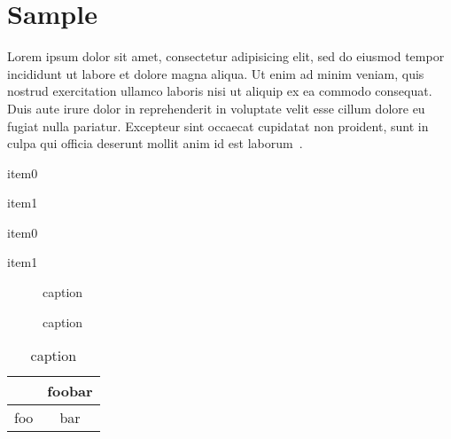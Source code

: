 \section{Sample}
\label{sec:sample}

Lorem ipsum dolor sit amet, consectetur adipisicing elit, sed do eiusmod tempor
incididunt ut labore et dolore magna aliqua. Ut enim ad minim veniam, quis
nostrud exercitation ullamco laboris nisi ut aliquip ex ea commodo consequat.
Duis aute irure dolor in reprehenderit in voluptate velit esse cillum dolore eu
fugiat nulla pariatur. Excepteur sint occaecat cupidatat non proident, sunt in
culpa qui officia deserunt mollit anim id est laborum~\cite{patt85}.

\begin{itemize*}
\item item0
\item item1
\end{itemize*}

{\setlength{\leftmargini}{0.2in}
\begin{itemize*}
\item item0
\item item1
\end{itemize*}
}

\begin{figure}[h]
\centering
\vspace{1in}
\caption{caption}
\label{fig:naive}
\end{figure}

\begin{figure}[h!]
\centering
\subfloat[subcaption0]{
\label{fig:subfig0}
\hspace{1.0in}
}
\subfloat[subcaption1]{
\label{fig:subfig1}
\hspace{1.0in}
}
\caption{caption}
\label{fig:fig}
\end{figure}

\begin{table}[h]
\begin{center}
\begin{tabular}{|l|c|}
\hline
    &   foobar  \\ \hline \hline
foo &   bar     \\ \hline 
\end{tabular}
\caption{caption}
\label{table:table}
\end{center}
\end{table}

